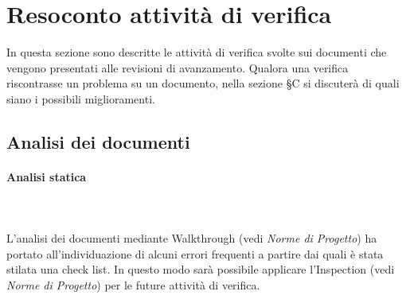 \section{Resoconto attività di verifica}
In questa sezione sono descritte le attività di verifica svolte sui documenti che vengono presentati alle revisioni di avanzamento. Qualora una verifica riscontrasse un problema su un documento, nella sezione \S C si discuterà di quali siano i possibili miglioramenti.

\subsection{Analisi dei documenti}
\paragraph*{Analisi statica} \mbox{} \\ \mbox{} \\
L'analisi dei documenti mediante Walkthrough (vedi \textit{Norme di Progetto}) ha portato all'individuazione di alcuni errori frequenti a partire dai quali è stata stilata una check list. In questo modo sarà possibile applicare l’Inspection (vedi \textit{Norme di Progetto}) per le future attività di verifica.

